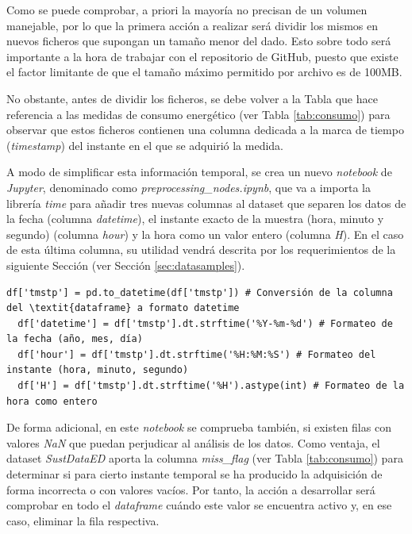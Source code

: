 \pagebreak

Como se puede comprobar, a priori la mayoría no precisan de un volumen manejable, por lo que la primera acción a realizar será dividir los mismos en nuevos ficheros que supongan un tamaño menor del dado. Esto sobre todo será importante a la hora de trabajar con el repositorio de GitHub, puesto que existe el factor limitante de que el tamaño máximo permitido por archivo es de 100MB. 

\vspace{3mm}

No obstante, antes de dividir los ficheros, se debe volver a la Tabla que hace referencia a las medidas de consumo energético (ver Tabla \ref{tab:consumo}) para observar que estos ficheros contienen una columna dedicada a la marca de tiempo (\textit{timestamp}) del instante en el que se adquirió la medida. 

\vspace{3mm}

A modo de simplificar esta información temporal, se crea un nuevo \textit{notebook} de \textit{Jupyter}, denominado como \textit{preprocessing\_nodes.ipynb}, que va a importa la librería \textit{time} para añadir tres nuevas columnas al dataset que separen los datos de la fecha (columna \textit{datetime}), el instante exacto de la muestra (hora, minuto y segundo) (columna \textit{hour}) y la hora como un valor entero (columna \textit{H}). En el caso de esta última columna, su utilidad vendrá descrita por los requerimientos de la siguiente Sección (ver Sección \ref{sec:datasamples}).

\vspace{3mm}

\begin{lstlisting}[style=Python-color, caption={Formato del timestamp}]
  df['tmstp'] = pd.to_datetime(df['tmstp']) # Conversión de la columna del \textit{dataframe} a formato datetime
  df['datetime'] = df['tmstp'].dt.strftime('%Y-%m-%d') # Formateo de la fecha (año, mes, día)
  df['hour'] = df['tmstp'].dt.strftime('%H:%M:%S') # Formateo del instante (hora, minuto, segundo)
  df['H'] = df['tmstp'].dt.strftime('%H').astype(int) # Formateo de la hora como entero
\end{lstlisting}

\vspace{3mm}

De forma adicional, en este \textit{notebook} se comprueba también, si existen filas con valores \textit{NaN} que puedan perjudicar al análisis de los datos. Como ventaja, el dataset \textit{SustDataED} aporta la columna \textit{miss\_flag} (ver Tabla \ref{tab:consumo}) para determinar si para cierto instante temporal se ha producido la adquisición de forma incorrecta o con valores vacíos. Por tanto, la acción a desarrollar será comprobar en todo el \textit{dataframe} cuándo este valor se encuentra activo y, en ese caso, eliminar la fila respectiva.

